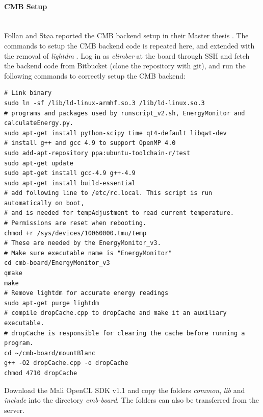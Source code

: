 \paragraph*{CMB Setup} \hfill \\
Follan and Støa reported the CMB backend setup in their Master thesis \cite{mt:T&S}. The commands to setup the CMB backend code is repeated here, and extended with the removal of \textit{lightdm} \cite{m:lightdm}. Log in as \textit{climber} at the board through SSH and fetch the backend code from Bitbucket (clone the repository with git), and run the following commands to correctly setup the CMB backend: \\

\begin{lstlisting}
# Link binary
sudo ln -sf /lib/ld-linux-armhf.so.3 /lib/ld-linux.so.3
# programs and packages used by runscript_v2.sh, EnergyMonitor and
calculateEnergy.py.
sudo apt-get install python-scipy time qt4-default libqwt-dev
# install g++ and gcc 4.9 to support OpenMP 4.0
sudo add-apt-repository ppa:ubuntu-toolchain-r/test
sudo apt-get update
sudo apt-get install gcc-4.9 g++-4.9
sudo apt-get install build-essential
# add following line to /etc/rc.local. This script is run automatically on boot,
# and is needed for tempAdjustment to read current temperature.
# Permissions are reset when rebooting.
chmod +r /sys/devices/10060000.tmu/temp
# These are needed by the EnergyMonitor_v3.
# Make sure executable name is "EnergyMonitor"
cd cmb-board/EnergyMonitor_v3
qmake
make
# Remove lightdm for accurate energy readings
sudo apt-get purge lightdm
# compile dropCache.cpp to dropCache and make it an auxiliary executable.
# dropCache is responsible for clearing the cache before running a program.
cd ~/cmb-board/mountBlanc
g++ -O2 dropCache.cpp -o dropCache
chmod 4710 dropCache
\end{lstlisting}
Download the Mali OpenCL SDK v1.1 and copy the folders \textit{common}, \textit{lib} and \textit{include} into the directory \textit{cmb-board}. The folders can also be transferred from the server.
